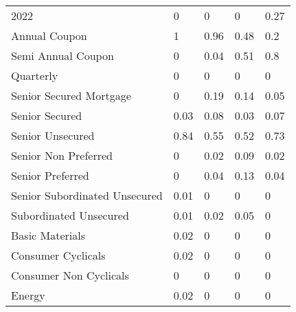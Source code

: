 \begin{table}[H]
\begin{tabular}{lllll}
2022 & \cellcolor[HTML]{FCFCFF}0 & \cellcolor[HTML]{FCFCFF}0 & \cellcolor[HTML]{FCFCFF}0 & \cellcolor[HTML]{D3ECDC}0.27 \\
Annual Coupon & \cellcolor[HTML]{63BE7B}1 & \cellcolor[HTML]{6AC181}0.96 & \cellcolor[HTML]{B3DFC0}0.48 & \cellcolor[HTML]{DEF0E5}0.2 \\
Semi Annual   Coupon & \cellcolor[HTML]{FCFCFF}0 & \cellcolor[HTML]{F6FAFA}0.04 & \cellcolor[HTML]{AEDDBC}0.51 & \cellcolor[HTML]{82CB96}0.8 \\
Quarterly & \cellcolor[HTML]{FCFCFF}0 & \cellcolor[HTML]{FCFCFF}0 & \cellcolor[HTML]{FCFCFF}0 & \cellcolor[HTML]{FCFCFF}0 \\
Senior   Secured Mortgage & \cellcolor[HTML]{FCFCFF}0 & \cellcolor[HTML]{DFF1E6}0.19 & \cellcolor[HTML]{E7F4ED}0.14 & \cellcolor[HTML]{F5F9F9}0.05 \\
Senior Secured & \cellcolor[HTML]{F8FBFC}0.03 & \cellcolor[HTML]{F0F8F5}0.08 & \cellcolor[HTML]{F8FBFC}0.03 & \cellcolor[HTML]{F2F8F6}0.07 \\
Senior Unsecured & \cellcolor[HTML]{7CC891}0.84 & \cellcolor[HTML]{A8DAB7}0.55 & \cellcolor[HTML]{ADDCBB}0.52 & \cellcolor[HTML]{8DCF9F}0.73 \\
Senior Non   Preferred & \cellcolor[HTML]{FCFCFF}0 & \cellcolor[HTML]{F9FBFD}0.02 & \cellcolor[HTML]{EFF7F4}0.09 & \cellcolor[HTML]{F9FBFD}0.02 \\
Senior Preferred & \cellcolor[HTML]{FCFCFF}0 & \cellcolor[HTML]{F6FAFA}0.04 & \cellcolor[HTML]{E9F4EE}0.13 & \cellcolor[HTML]{F6FAFA}0.04 \\
Senior   Subordinated Unsecured & \cellcolor[HTML]{FBFCFE}0.01 & \cellcolor[HTML]{FCFCFF}0 & \cellcolor[HTML]{FCFCFF}0 & \cellcolor[HTML]{FCFCFF}0 \\
Subordinated   Unsecured & \cellcolor[HTML]{FBFCFE}0.01 & \cellcolor[HTML]{F9FBFD}0.02 & \cellcolor[HTML]{F5F9F9}0.05 & \cellcolor[HTML]{FCFCFF}0 \\
Basic Materials & \cellcolor[HTML]{F9FBFD}0.02 & \cellcolor[HTML]{FCFCFF}0 & \cellcolor[HTML]{FCFCFF}0 & \cellcolor[HTML]{FCFCFF}0 \\
Consumer   Cyclicals & \cellcolor[HTML]{F9FBFD}0.02 & \cellcolor[HTML]{FCFCFF}0 & \cellcolor[HTML]{FCFCFF}0 & \cellcolor[HTML]{FCFCFF}0 \\
Consumer   Non Cyclicals & \cellcolor[HTML]{FCFCFF}0 & \cellcolor[HTML]{FCFCFF}0 & \cellcolor[HTML]{FCFCFF}0 & \cellcolor[HTML]{FCFCFF}0 \\
Energy & \cellcolor[HTML]{F9FBFD}0.02 & \cellcolor[HTML]{FCFCFF}0 & \cellcolor[HTML]{FCFCFF}0 & \cellcolor[HTML]{FCFCFF}0 \\

\end{tabular}
\end{table}
